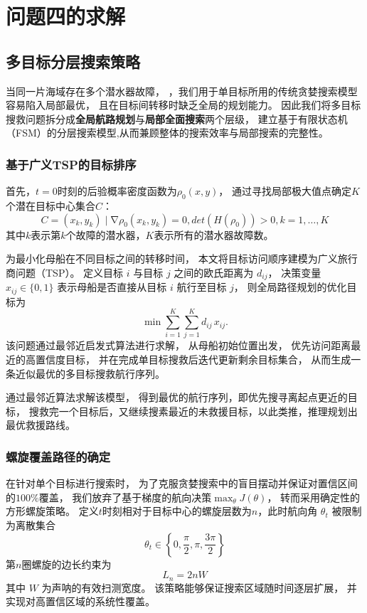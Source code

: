 \documentclass{mcmthesis}
\begin{document}
\section{问题四的求解}
\subsection{多目标分层搜索策略}
当同一片海域存在多个潜水器故障，
，我们用于单目标所用的传统贪婪搜索模型容易陷入局部最优，
且在目标间转移时缺乏全局的规划能力。
因此我们将多目标搜救问题拆分成\textbf{全局航路规划}与\textbf{局部全面搜索}两个层级，
建立基于有限状态机（FSM）的分层搜索模型,从而兼顾整体的搜索效率与局部搜索的完整性。
\subsubsection*{基于广义TSP的目标排序}
首先，$t=0$时刻的后验概率密度函数为$\rho_0(x,y)$，
通过寻找局部极大值点确定$K$个潜在目标中心集合$C$：
\begin{equation}
  C={(x_k,y_k)\mid\mathrm{\nabla}\rho_0(x_k,y_k)=0,det(H(\rho_0))>0,k=1,\ldots,K}
\end{equation}
其中$k$表示第$k$个故障的潜水器，$K$表示所有的潜水器故障数。

为最小化母船在不同目标之间的转移时间，
本文将目标访问顺序建模为广义旅行商问题（TSP）。
定义目标 $i$ 与目标 $j$ 之间的欧氏距离为 $d_{ij}$，
决策变量 $x_{ij}\in\{0,1\}$ 表示母船是否直接从目标 $i$ 航行至目标 $j$，
则全局路径规划的优化目标为
\begin{equation}
  \min \sum_{i=1}^{K}\sum_{j=1}^{K} d_{ij}\,x_{ij}.
\end{equation}
该问题通过最邻近启发式算法进行求解，
从母船初始位置出发，
优先访问距离最近的高置信度目标，
并在完成单目标搜救后迭代更新剩余目标集合，
从而生成一条近似最优的多目标搜救航行序列。

通过最邻近算法求解该模型，
得到最优的航行序列，即优先搜寻离起点更近的目标，
搜救完一个目标后，又继续搜素最近的未救援目标，以此类推，推理规划出最优救援路线。
\subsubsection*{螺旋覆盖路径的确定}
在针对单个目标进行搜索时，
为了克服贪婪搜索中的盲目摆动并保证对置信区间的$100\%$覆盖，
我们放弃了基于梯度的航向决策$\max_{\theta} J(\theta)$，
转而采用确定性的方形螺旋策略。
定义$t$时刻相对于目标中心的螺旋层数为$n$，此时航向角 $\theta_t$ 被限制为离散集合
\begin{equation}
  \theta_t \in \left\{0,\frac{\pi}{2},\pi,\frac{3\pi}{2}\right\}
\end{equation}
第$n$圈螺旋的边长约束为\begin{equation}
  L_n = 2nW
\end{equation}
其中 $W$ 为声呐的有效扫测宽度。
该策略能够保证搜索区域随时间逐层扩展，
并实现对高置信区域的系统性覆盖。
\end{document}
